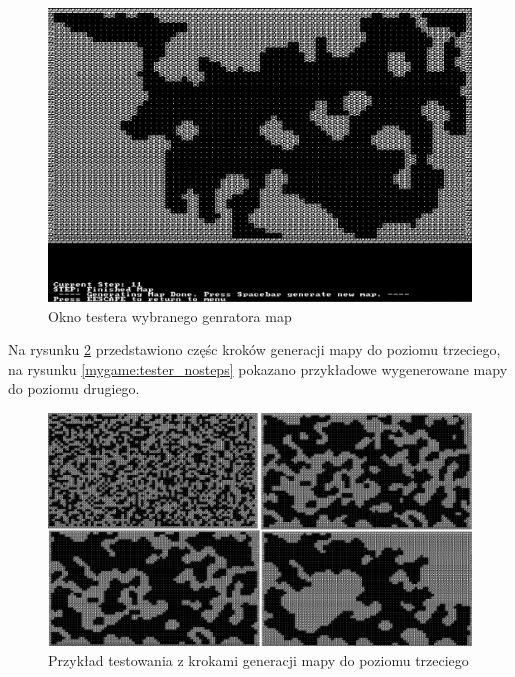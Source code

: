 \documentclass[12pt,twoside]{article}
\begin{document}
\FloatBarrier
\begin{figure}[h]
	\centering
	\includegraphics[width=14cm]{images/mygame/window_tester.png}
	\caption{Okno testera wybranego genratora map}
	\label{mygame:window_tester}
\end{figure}
\FloatBarrier

Na rysunku \ref{mygame:tester_steps} przedstawiono częśc kroków generacji mapy do poziomu trzeciego, na rysunku \ref{mygame:tester_nosteps} pokazano przykładowe wygenerowane mapy do poziomu drugiego.

\FloatBarrier
\begin{figure}[h]
	\centering
	\includegraphics[width=16cm]{images/mygame/tester_steps.png}
	\caption{Przykład testowania z krokami generacji mapy do poziomu trzeciego}
	\label{mygame:tester_steps}
\end{figure}
\FloatBarrier
\end{document}
